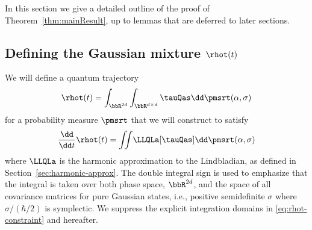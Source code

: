\documentclass{article}
\numberwithin{equation}{section}
\begin{document}
In this section we give a detailed outline of the proof of Theorem~\ref{thm:mainResult}, up to lemmas that are deferred to later sections.  













\subsection{Defining the Gaussian mixture \texorpdfstring{$\rhot(t)$}{}}\label{sec:def-rhot}


We will define a quantum trajectory
\begin{align} \label{eq:rho_tilde_mixture}
	\rhot(t) = \int_{\bbR^{2d}} \int_{\bbR^{d\times d}} \tauQas \dd \pmsrt(\alpha,\sigma)
\end{align}
for a probability measure $\pmsrt$ that we will construct to satisfy
\begin{equation}
\label{eq:rhot-constraint}
\frac{\dd}{\dd t} \rhot(t) = 
\iint \!  \LLQLa[\tauQas] \dd\pmsrt(\alpha,\sigma)
\end{equation}
where $\LLQLa$ is the harmonic approximation to the Lindbladian, as defined in Section~\ref{sec:harmonic-approx}. The double integral sign is used to emphasize that the integral is taken over both phase space, $\bbR^{2d}$, and the space of all covariance matrices for pure Gaussian states, i.e., positive semidefinite $\sigma$ where $\sigma/(\hbar/2)$ is symplectic. We suppress the explicit integration domains in \eqref{eq:rhot-constraint} and hereafter.
\end{document}
